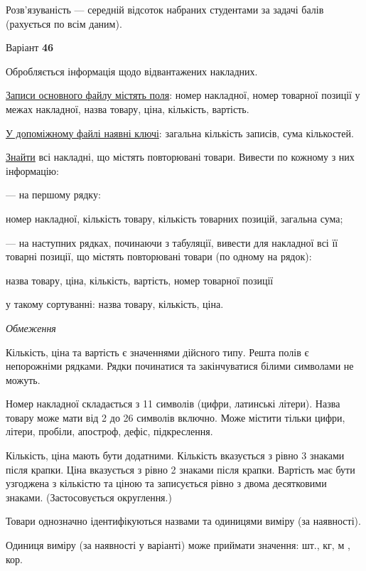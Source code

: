 \documentclass[11pt, ukrainian]{article}
\begin{document}
Розв'язуваність --- середній відсоток набраних студентами за задачі балів (рахується по всім даним).




\par
\newpage
{\center Варіант  \No \textbf { 46 }\par}
\bigskip
Обробляється інформація щодо відвантажених накладних.

\underline{Записи основного файлу містять поля}: номер накладної, номер товарної позиції у межах накладної, назва товару, ціна, кількість, вартість.

\underline{У допоміжному файлі наявні ключі}: загальна кількість записів, сума кількостей.

\underline{Знайти} всі накладні, що містять повторювані товари. Вивести по кожному з них інформацію:\par
{\noindent}--- на першому рядку:\par
номер накладної, кількість товару, кількість товарних позицій, загальна сума;

{\noindent}--- на наступних рядках, починаючи з табуляції, вивести для накладної всі її товарні позиції, що містять повторювані товари (по одному на рядок):\par
назва товару, ціна, кількість, вартість, номер товарної позиції

{\noindent}у такому сортуванні: назва товару, кількість, ціна.


\bigskip\textit{Обмеження}

Кількість, ціна та вартість є значеннями дійсного типу.
Решта полів є непорожніми рядками.
Рядки починатися та закінчуватися білими символами не можуть.

Номер накладної складається з 11 символів (цифри, латинські літери).
Назва товару може мати від 2 до 26 символів включно.
Може містити тільки цифри, літери, пробіли, апостроф, дефіс, підкреслення.

Кількість, ціна мають бути додатними.
Кількість вказується з рівно 3 знаками після крапки.
Ціна вказується з рівно 2 знаками після крапки.
Вартість має бути узгоджена з кількістю та ціною та записується рівно з двома десятковими знаками.
(Застосовується округлення.)

Товари однозначно ідентифікуються назвами та одиницями виміру (за наявності).

Одиниця виміру (за наявності у варіанті) може приймати значення: шт., кг, м , кор.
\end{document}
